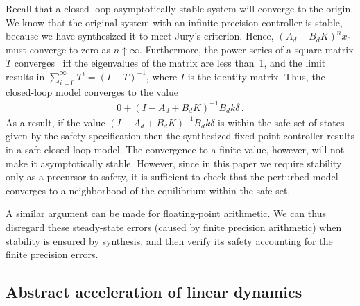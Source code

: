 \normalsize
Recall that a closed-loop asymptotically stable system will converge to the origin.  
We know that the original system with an infinite precision controller is stable, 
because we have synthesized it to meet Jury's criterion.  
Hence, $(A_d - B_dK)^n x_0$  must converge to zero as $n \uparrow \infty$. 
Furthermore, the power series of a square matrix $T$ converges~\cite{horn1990matrix} iff the eigenvalues of the matrix are less
than~1, and the limit results in 
%
$\sum_{i=0}^{\infty}T^i  = (I - T)^{-1}$, 
%
where $I$ is the identity matrix. 
Thus, the closed-loop model converges to the value 
%
\begin{align*}
0 + (I - A_d + B_dK)^{-1}B_dk\delta \,. 
\end{align*}
%
As a result, if the value $(I - A_d + B_dK)^{-1}B_dk\delta$ is within the safe set of states given by the safety specification
then the synthesized fixed-point controller results in a safe
closed-loop model.  The convergence to a finite value, however, will not
make it asymptotically stable.
However,
since in this paper we require stability only as a precursor to safety, it
is sufficient to check that the perturbed model converges to a
neighborhood of the equilibrium within the safe set. 

A similar argument can be made for floating-point arithmetic.
We can thus disregard these steady-state errors (caused by
finite precision arithmetic) when stability is ensured by synthesis, and then verify its
safety accounting for the finite precision errors.



\ifx\axelerator
\subsection{Abstract acceleration of linear dynamics } 
\label{ssec:aa}
 
